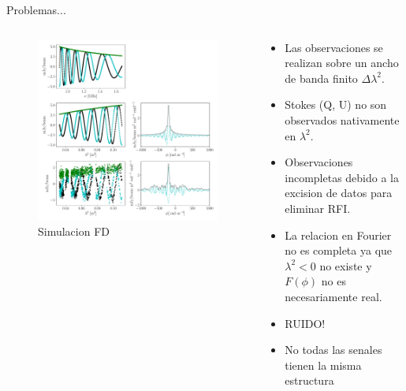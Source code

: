 \documentclass[xetex,aspectratio=169]{beamer}
\begin{document}
	\begin{frame}{Problemas...}
		
		\begin{columns}[onlytextwidth,t]
			\begin{column}{.4\textwidth}
				\begin{figure}
					\centering
					\includegraphics[width=\textwidth, keepaspectratio]{figures/example_ursi.pdf}
					\caption*{Simulacion FD}
				\end{figure}
			\end{column}
			\begin{column}{.6\textwidth}
				\begin{itemize}
					\item Las observaciones se realizan sobre un ancho de banda finito $\Delta \lambda^2$.
					\item Stokes (Q, U) no son observados nativamente en $\lambda^2$.
					\item Observaciones incompletas debido a la excision de datos para eliminar RFI.
					\item La relacion en Fourier no es completa ya que $\lambda^2 < 0 $	no existe y $F(\phi)$ no es necesariamente real.
					\item \alert{RUIDO!}
					\item No todas las senales tienen la misma estructura %
				\end{itemize}
			\end{column}
		\end{columns}
		
	\end{frame}
\end{document}
